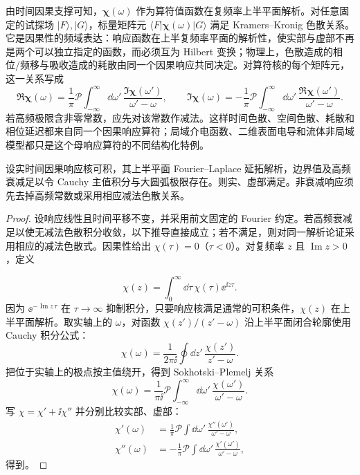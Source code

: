 由时间因果支撑可知，$\boldsymbol\chi(\omega)$ 作为算符值函数在复频率上半平面解析。对任意固定的试探场 $|F\rangle,|G\rangle$，标量矩阵元
$\langle F|\boldsymbol\chi(\omega)|G\rangle$ 满足 Kramers--Kronig 色散关系。它是因果性的频域表达：响应函数在上半复频率平面的解析性，使实部与虚部不再是两个可以独立指定的函数，而必须互为 Hilbert 变换；物理上，色散造成的相位/频移与吸收造成的耗散由同一个因果响应共同决定。对算符核的每个矩阵元，这一关系写成
\begin{equation}
\boxed{
\Re\boldsymbol\chi(\omega)
=\frac1\pi\mathcal P\int_{-\infty}^{\infty}\dd\omega'\,
\frac{\Im\boldsymbol\chi(\omega')}{\omega'-\omega},
\qquad
\Im\boldsymbol\chi(\omega)
=-\frac1\pi\mathcal P\int_{-\infty}^{\infty}\dd\omega'\,
\frac{\Re\boldsymbol\chi(\omega')}{\omega'-\omega}.}
\label{eq:material_kramers_kronig}
\end{equation}
若高频极限含非零常数，应先对该常数作减法。这样时间色散、空间色散、耗散和相位延迟都来自同一个因果响应算符；局域介电函数、二维表面电导和流体非局域模型都只是这个母响应算符的不同结构化特例。

\begin{theorem}
设实时间因果响应核可积，其上半平面 Fourier--Laplace 延拓解析，边界值及高频衰减足以令 Cauchy 主值积分与大圆弧极限存在。则实、虚部满足。非衰减响应须先去掉高频常数或采用相应减法色散关系。
\end{theorem}
\begin{proof}
设响应线性且时间平移不变，并采用前文固定的 Fourier 约定。若高频衰减足以使无减法色散积分收敛，以下推导直接成立；若不满足，则对同一解析论证采用相应的减法色散式。因果性给出 $\chi(\tau)=0$（$\tau<0$）。对复频率 $z$ 且 $\operatorname{Im}z>0$，定义

\[
\chi(z)=\int_0^\infty\dd\tau\,\chi(\tau)\ee^{\ii z\tau}.
\]
因为 $\ee^{-\operatorname{Im}z\,\tau}$ 在 $\tau\to\infty$ 抑制积分，只要响应核满足通常的可积条件，$\chi(z)$ 在上半平面解析。取实轴上的 $\omega$，对函数 $\chi(z')/(z'-\omega)$ 沿上半平面闭合轮廓使用 Cauchy 积分公式：
\[
\chi(\omega)
=\frac{1}{2\pi\ii}
\oint\dd z'\,
\frac{\chi(z')}{z'-\omega}.
\]
把位于实轴上的极点按主值绕开，得到 Sokhotski--Plemelj 关系
\[
\chi(\omega)
=\frac{1}{\pi\ii}\mathcal P
\int_{-\infty}^{\infty}\dd\omega'\,
\frac{\chi(\omega')}{\omega'-\omega}.
\]
写 $\chi=\chi'+\ii\chi''$ 并分别比较实部、虚部：
\begin{align*}
\chi'(\omega)
&=\frac1\pi\mathcal P
\int\dd\omega'\,
\frac{\chi''(\omega')}{\omega'-\omega},\\
\chi''(\omega)
&=-\frac1\pi\mathcal P
\int\dd\omega'\,
\frac{\chi'(\omega')}{\omega'-\omega},
\end{align*}
得到。
\end{proof}



